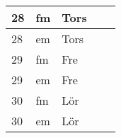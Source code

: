 \documentclass[a4paper]{article}
\begin{document}
\begin{table}[ht!]
\begin{tabular}{lllp{7cm}p{7cm}}
\multicolumn{1}{|l|}{28} & \multicolumn{1}{l|}{fm} & \multicolumn{1}{l|}{Tors} & \multicolumn{1}{l|}{} & \multicolumn{1}{l|}{} \\ \hline
\multicolumn{1}{|l|}{28} & \multicolumn{1}{l|}{em} & \multicolumn{1}{l|}{Tors} & \multicolumn{1}{l|}{} & \multicolumn{1}{l|}{} \\ \hline    

\multicolumn{1}{|l|}{29} & \multicolumn{1}{l|}{fm} & \multicolumn{1}{l|}{Fre} & \multicolumn{1}{l|}{} & \multicolumn{1}{l|}{} \\ \hline
\multicolumn{1}{|l|}{29} & \multicolumn{1}{l|}{em} & \multicolumn{1}{l|}{Fre} & \multicolumn{1}{l|}{} & \multicolumn{1}{l|}{} \\ \hline    

\multicolumn{1}{|l|}{30} & \multicolumn{1}{l|}{fm} & \multicolumn{1}{l|}{Lör} & \multicolumn{1}{l|}{} & \multicolumn{1}{l|}{} \\ \hline
\multicolumn{1}{|l|}{30} & \multicolumn{1}{l|}{em} & \multicolumn{1}{l|}{Lör} & \multicolumn{1}{l|}{} & \multicolumn{1}{l|}{} \\ \hline    

    \end{tabular}
    \end{table}
    
\end{document}
